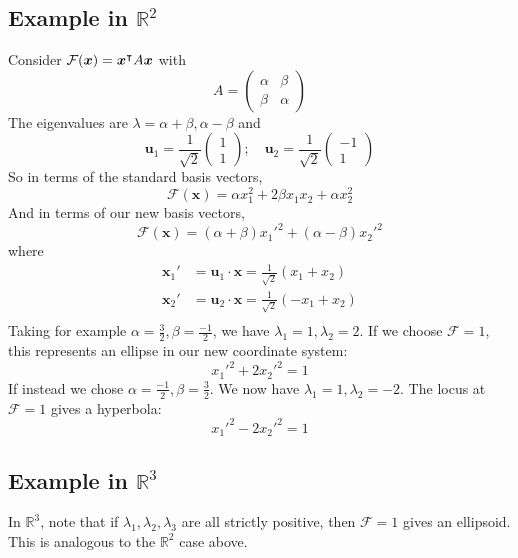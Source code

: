 \documentclass{article}
\begin{document}
	\subsection{Example in $\mathbb R^2$}
	Consider $\mathcal F(\bm x) = \bm x^\intercal A \bm x$ with
	\[ A = \begin{pmatrix}
		\alpha & \beta \\ \beta & \alpha
	\end{pmatrix} \]
	The eigenvalues are $\lambda = \alpha + \beta, \alpha - \beta$ and
	\[ \bm u_1 = \frac{1}{\sqrt 2}\begin{pmatrix}
		1 \\ 1
	\end{pmatrix};\quad \bm u_2 = \frac{1}{\sqrt 2}\begin{pmatrix}
		-1 \\ 1
	\end{pmatrix} \]
	So in terms of the standard basis vectors,
	\[ \mathcal F(\bm x) = \alpha x_1^2 + 2\beta x_1x_2 + \alpha x_2^2 \]
	And in terms of our new basis vectors,
	\[ \mathcal F(\bm x) = (\alpha + \beta) x_1'^2 + (\alpha - \beta) x_2'^2 \]
	where
	\begin{align*}
		\bm x_1' &= \bm u_1 \cdot \bm x = \frac{1}{\sqrt 2}(x_1 + x_2) \\
		\bm x_2' &= \bm u_2 \cdot \bm x = \frac{1}{\sqrt 2}(-x_1 + x_2) \\
	\end{align*}
	Taking for example $\alpha = \frac{3}{2}, \beta = \frac{-1}{2}$, we have $\lambda_1 = 1, \lambda_2 = 2$. If we choose $\mathcal F = 1$, this represents an ellipse in our new coordinate system:
	\[ x_1'^2 + 2x_2'^2 = 1 \]
	If instead we chose $\alpha = \frac{-1}{2}, \beta = \frac{3}{2}$. We now have $\lambda_1 = 1, \lambda_2 = -2$. The locus at $\mathcal F = 1$ gives a hyperbola:
	\[ x_1'^2 - 2x_2'^2 = 1 \]

	\subsection{Example in $\mathbb R^3$}
	In $\mathbb R^3$, note that if $\lambda_1, \lambda_2, \lambda_3$ are all strictly positive, then $\mathcal F = 1$ gives an ellipsoid. This is analogous to the $\mathbb R^2$ case above.
	
\end{document}
